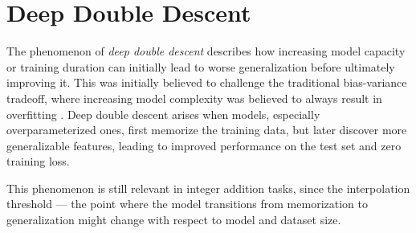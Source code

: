\section{Deep Double Descent}\label{sec:deep_double_descent}

The phenomenon of \emph{deep double descent} describes how increasing model capacity or training duration can initially lead to worse generalization before ultimately improving it. This was initially believed to challenge the traditional bias-variance tradeoff, where increasing model complexity was believed to always result in overfitting \parencite{belkin_reconciling_2019, nakkiran_deep_2021}. Deep double descent arises when models, especially overparameterized ones, first memorize the training data, but later discover more generalizable features, leading to improved performance on the test set and zero training loss.

This phenomenon is still relevant in integer addition tasks, since the interpolation threshold — the point where the model transitions from memorization to generalization might change with respect to model and dataset size.
